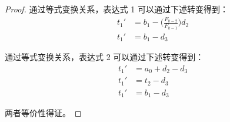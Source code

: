 \documentclass[a4paper, 12pt]{ctexart}  %
\begin{document}
\begin{proof}
通过等式变换关系，表达式 1 可以通过下述转变得到：
\begin{align*}
t_{1}' &= b_{1} - \bigg( \frac{F_{k-2}}{F_{k-1}}  \bigg) d_{2} 	\\
t_{1}' &= b_{1} - d_{3}
\end{align*}

通过等式变换关系，表达式 2 可以通过下述转变得到：
\begin{align*}
t_{1}' &= a_{0} + d_{2} - d_{3} \\
t_{1}' &= t_{2} - d_{3} \\
t_{1}' &= b_{1} - d_{3} 
\end{align*}

两者等价性得证。
\end{proof}
\end{document}
